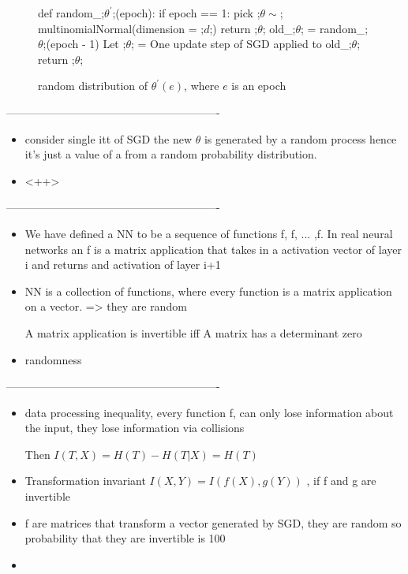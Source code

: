 \begin{figure}[H]
    \begin{pythonfigure}
      def random_;$\theta^\prime$;(epoch):
        if epoch == 1:
          pick ;$\theta \sim$; multinomialNormal(dimension = ;$d$;)
          return ;$\theta$;
        old_;$\theta$; = random_;$\theta$;(epoch - 1)
        Let ;$\theta$; = One update step of SGD applied to old_;$\theta$;
        return ;$\theta$;

    \end{pythonfigure}
    \caption{random distribution of $\theta^\prime(e)$, where $e$ is an epoch}
    \label{fig:randomTheta}
\end{figure}



----------------------------------------------------------

\begin{itemize}
  \item{
      consider single itt of SGD the new $\theta$ is generated by a random
      process hence it's just a value of a from a random probability
      distribution.
    }
  \item{
      <++>
    }
\end{itemize}

----------------------------------------------------------

\begin{itemize}
  \item{
      We have defined a NN to be a sequence of functions f, f, ... ,f. In real
      neural networks an f is a matrix application that takes in a activation
      vector of layer i and returns and activation of layer i+1
    }
  \item{
      NN is a collection of functions, where every function is a matrix
      application on a vector. => they are random 

      A matrix application is invertible iff A matrix has a determinant zero
    }
  \item{
      randomness
    }
\end{itemize}

----------------------------------------------------------


\begin{itemize}
  \item{
      data processing inequality, every function f, can only lose information
      about the input, they lose information via collisions

      Then $I(T, X) = H(T) - H(T|X) = H(T)$
    }
  \item{
      Transformation invariant $I(X, Y) = I(f(X), g(Y))$ , if f and g are
      invertible
    }
  \item{
      f are matrices that transform a vector generated by SGD, they are random
      so probability that they are invertible is 100%
    }
  \item{
      
    }
\end{itemize}

